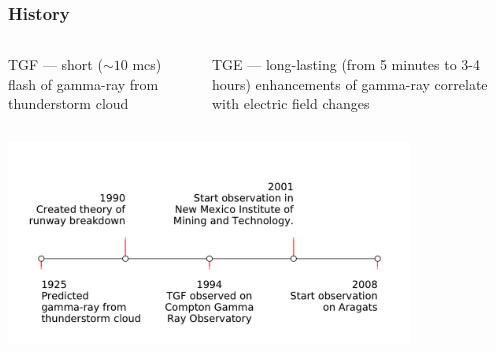 \documentclass[8pt,pdf,hyperref={unicode}]{beamer}
\begin{document}
\begin{frame}
\frametitle{History}
	\begin{columns}
		\begin{column}{0.5\textwidth}
			TGF --- short ($\sim 10$ mcs) flash of gamma-ray from thunderstorm cloud
		\end{column}
		\begin{column}{0.5\textwidth}
			TGE --- long-lasting (from 5 minutes to 3-4 hours)  enhancements of gamma-ray correlate with electric field changes  
		\end{column}
	\end{columns}
\centering\includegraphics[width=0.8\textwidth]{timeline.pdf}

\end{frame}
\end{document}
